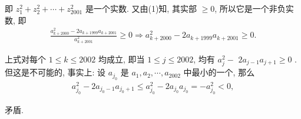 \begin{solution}
	即 $z_1^2+z_2^2+\cdots+z_{2001}^2$ 是一个实数.
	又由(1)知, 其实部 $\geqslant 0$, 所以它是一个非负实数, 即
	\begin{align*}
		\frac{a_{k+2000}^2-2 a_{k+1999} a_{k+2001}}{a_{k+2001}^2} \geqslant 0 \Rightarrow a_{k+2000}^2-2 a_{k+1999} a_{k+2001} \geqslant 0 .
	\end{align*}

	上式对每个 $1 \leqslant k \leqslant 2002$ 均成立, 即当 $1 \leqslant j \leqslant 2002$, 均有 $a_j^2-$ $2 a_{j-1} a_{j+1} \geqslant 0$ . 但这是不可能的, 事实上:
	设 $a_{j_0}$ 是 $a_1, a_2, \cdots, a_{2002}$ 中最小的一个, 那么
	\begin{align*}
		a_{j_0}^2-2 a_{j_0-1} a_{j_0+1} \leqslant a_{j_0}^2-2 a_{j_0} a_{j_0}=-a_{j_0}^2<0,
	\end{align*}

	矛盾.
\end{solution}

